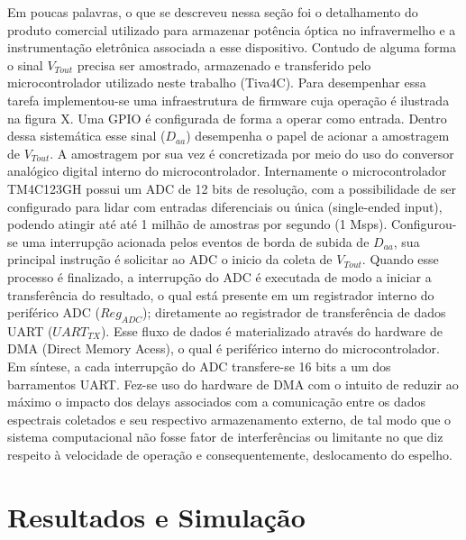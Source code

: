 \documentclass[oneside,openright,12pt]{ufsm_2021} %
\begin{document}
            \par Em poucas palavras, o que se descreveu nessa seção foi o detalhamento do produto comercial utilizado para armazenar potência óptica no infravermelho e a instrumentação eletrônica associada a esse dispositivo. Contudo de alguma forma o sinal $V_{Tout}$ precisa ser amostrado, armazenado e transferido pelo microcontrolador utilizado neste trabalho (Tiva4C). Para desempenhar essa tarefa implementou-se uma infraestrutura de firmware cuja operação é ilustrada na figura X. Uma GPIO é configurada de forma a operar como entrada. Dentro dessa sistemática esse sinal ($D_{aa}$) desempenha o papel de acionar a amostragem de $V_{Tout}$. A amostragem por sua vez é concretizada por meio do uso do conversor analógico digital interno do microcontrolador. Internamente o microcontrolador TM4C123GH possui um ADC de 12 bits de resolução, com a possibilidade de ser configurado para lidar com entradas diferenciais ou única (single-ended input), podendo atingir até até 1 milhão de amostras por segundo (1 Msps).
            Configurou-se uma interrupção acionada pelos eventos de borda de subida de $D_{aa}$, sua principal instrução é solicitar ao ADC o inicio da coleta de $V_{Tout}$. Quando esse processo é finalizado, a interrupção do ADC é executada de modo a iniciar a transferência do resultado, o qual está presente em um registrador interno do periférico ADC ($Reg_{ADC}$); diretamente ao registrador de transferência de dados UART ($UART_{TX}$). Esse fluxo de dados é materializado através do hardware de DMA (Direct Memory Acess), o qual é periférico interno do microcontrolador. Em síntese, a cada interrupção do ADC transfere-se 16 bits a um dos barramentos UART. Fez-se uso do hardware de DMA com o intuito de reduzir ao máximo o impacto dos delays associados com a comunicação entre os dados espectrais coletados e seu respectivo armazenamento externo, de tal modo que o sistema computacional não fosse fator de interferências ou limitante no que diz respeito à velocidade de operação e consequentemente, deslocamento do espelho.
            

\chapter{Resultados e Simulação}
\label{cap:Resultados}
\end{document}
